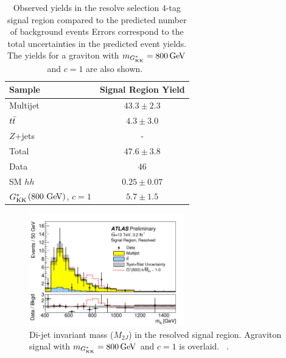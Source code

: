 \begin{table}[!ht]
\begin{center}
\begin{tabular}{ l c  }
\toprule
 Sample      & Signal Region Yield \\ 
\midrule
Multijet     & $43.3 \pm 2.3$   \\
$t\bar{t}$       &  $4.3 \pm 3.0$   \\
$Z$+jets     &  -           \\
\midrule
Total        & $47.6 \pm 3.8$   \\
 \midrule
Data         & $46$    \\
\midrule
SM $hh$ & $0.25 \pm 0.07$ \\
$G^*_{\rm KK}$$\left(800\,\rm{\GeV}\right)$, $c = 1$ & $5.7 \pm 1.5$ \\
\bottomrule
\end{tabular}
\caption{Observed yields in the resolve selection $4$-tag signal region compared to the predicted number of background events
  Errors correspond to the total uncertainties in the predicted event yields. The yields for a graviton with $m_{\Gkk} = 800\GeV$ and $c = 1$ are also shown.~\cite{4bconf}}
\label{tab:ResolvedResults} 
\end{center}
\end{table}

\begin{figure}[h!]
  \centering
  \captionsetup{justification=centering}

  \includegraphics[width=0.6\textwidth]{figures/Resolved_signal}


   \caption{Di-jet invariant mass ($M_{2J}$) in the resolved signal region. Agraviton signal with $m_{\Gkk} = 800 \GeV$ and $c=1$ is overlaid. ~\cite{4bconf}.}
  \label{fig:ResolvedResults}
\end{figure}

